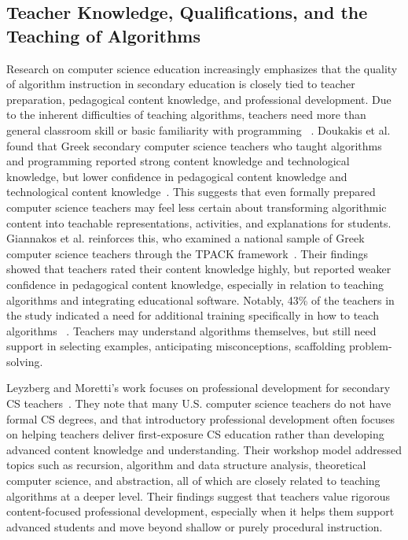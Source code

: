 \subsection{Teacher Knowledge, Qualifications, and the Teaching of Algorithms}

Research on computer science education increasingly emphasizes that the quality of algorithm instruction in secondary education is closely tied to
  teacher preparation, pedagogical content knowledge, and professional development.
Due to the inherent difficulties of teaching algorithms, teachers need more than general classroom skill or basic familiarity with programming
~\cite{yadav2016computational}.
Doukakis et al.
found that Greek secondary computer science teachers who taught algorithms and programming reported strong content knowledge and technological knowledge, but lower confidence in pedagogical content knowledge and technological content knowledge~\cite{doukakis2013measuring}.
This suggests that even formally prepared computer science teachers may feel less certain about transforming algorithmic content into teachable
  representations, activities, and explanations for students.
Giannakos et al.
reinforces this, who examined a national sample of Greek computer science teachers through the TPACK framework~\cite{giannakos2014examining}.
Their findings showed that teachers rated their content knowledge highly, but reported weaker confidence in pedagogical content knowledge, especially
  in relation to teaching algorithms and integrating educational software.
Notably, 43\% of the teachers in the study indicated a need for additional training specifically in how to teach algorithms
~\cite{giannakos2014examining}.
Teachers may understand algorithms themselves, but still need support in selecting examples, anticipating misconceptions, scaffolding
  problem-solving.

Leyzberg and Moretti's work focuses on professional development for secondary CS teachers~\cite{leyzberg2017teaching}.
They note that many U.S.
computer science teachers do not have formal CS degrees, and that introductory professional development often focuses on helping teachers deliver first-exposure CS education rather than developing advanced content knowledge and understanding.
Their workshop model addressed topics such as recursion, algorithm and data structure analysis, theoretical computer science, and abstraction, all of
  which are closely related to teaching algorithms at a deeper level.
Their findings suggest that teachers value rigorous content-focused professional development, especially when it helps them support advanced students
  and move beyond shallow or purely procedural instruction.

